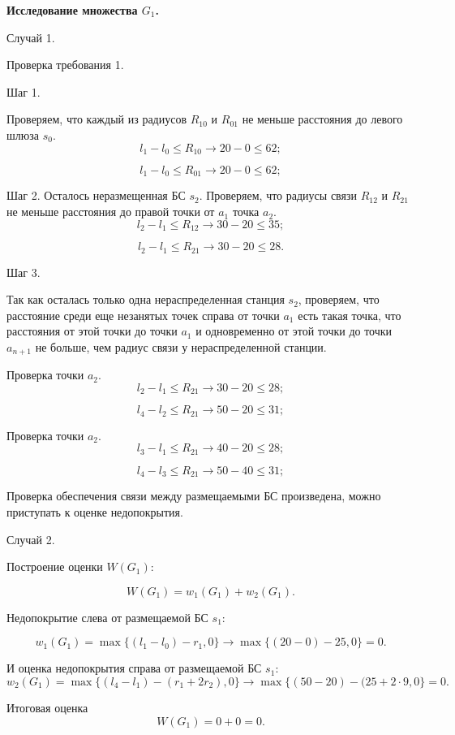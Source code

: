 \textbf{Исследование множества $G_1$.}

Случай 1.

Проверка требования 1.

Шаг 1.

Проверяем, что каждый из радиусов $R_{10}$ и $R_{01}$ не меньше расстояния  до левого шлюза $s_0$. 
$$
l_1 - l_0 \leqslant R_{10} \rightarrow 20 - 0 \leqslant 62;
$$

$$
l_1 - l_0 \leqslant R_{01} \rightarrow 20 - 0 \leqslant 62;
$$

Шаг 2.
Осталось неразмещенная БС $s_2$. Проверяем, что радиусы связи $R_{12}$ и $R_{21}$ не меньше расстояния до правой точки от $a_1$ точка $a_2$.
$$
l_2 - l_1 \leqslant R_{12} \rightarrow 30 - 20 \leqslant 35;
$$

$$
l_2 - l_1 \leqslant R_{21} \rightarrow 30 - 20 \leqslant 28.
$$

Шаг 3.

Так как осталась только одна нераспределенная станция $s_2$, проверяем, что расстояние среди еще незанятых точек справа от точки $a_1$  есть такая точка, что расстояния от этой точки до точки $a_1$ и одновременно от этой точки до точки $a_{n+1}$ не больше, чем  радиус связи у нераспределенной станции.

Проверка точки $a_2$.
$$
l_2 - l_1 \leqslant R_{21} \rightarrow 30 - 20 \leqslant  28;
$$

$$
l_4 - l_2 \leqslant R_{21} \rightarrow 50 - 20 \leqslant  31;
$$

Проверка точки $a_2$.
$$
l_3 - l_1 \leqslant R_{21} \rightarrow 40 - 20 \leqslant  28;
$$

$$
l_4 - l_3 \leqslant R_{21} \rightarrow 50 - 40 \leqslant  31;
$$

Проверка обеспечения связи между размещаемыми БС произведена, можно приступать к оценке недопокрытия.

Случай 2.

Построение оценки $W(G_1)$:

$$
W(G_1) = w_1(G_1) + w_2(G_1).
$$

Недопокрытие слева от размещаемой БС $s_1$:

$$
w_1(G_1) = \max\{(l_1 - l_0) - r_1, 0\} \rightarrow \max\{(20 - 0) - 25, 0\} = 0.
$$

И оценка недопокрытия справа от размещаемой БС $s_1$: 
$$
w_2(G_1) = \max\{(l_4 - l_1) - (r_1 + 2r_2), 0\} \rightarrow \max\{(50 - 20) - (25 + 2 \cdot 9, 0\} = 0.
$$

Итоговая оценка
$$
W(G_1) = 0 + 0 = 0.
$$

